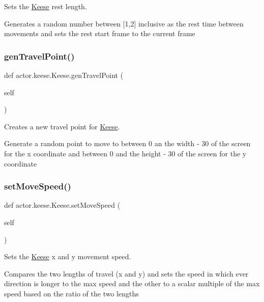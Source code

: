 Sets the \hyperlink{classactor_1_1keese_1_1_keese}{Keese} rest length. 

Generates a random number between \mbox{[}1,2\mbox{]} inclusive as the rest time between movements and sets the rest start frame to the current frame \mbox{\label{classactor_1_1keese_1_1_keese_a7abbd03624a6695b83d3086e48957d86}} 
\subsubsection{\texorpdfstring{gen\+Travel\+Point()}{genTravelPoint()}}
{\footnotesize\ttfamily def actor.\+keese.\+Keese.\+gen\+Travel\+Point (\begin{DoxyParamCaption}\item[{}]{self }\end{DoxyParamCaption})}



Creates a new travel point for \hyperlink{classactor_1_1keese_1_1_keese}{Keese}. 

Generate a random point to move to between 0 an the width -\/ 30 of the screen for the x coordinate and between 0 and the height -\/ 30 of the screen for the y coordinate \mbox{\label{classactor_1_1keese_1_1_keese_a6fe0305b143de210b4b161a1091f7891}} 
\subsubsection{\texorpdfstring{set\+Move\+Speed()}{setMoveSpeed()}}
{\footnotesize\ttfamily def actor.\+keese.\+Keese.\+set\+Move\+Speed (\begin{DoxyParamCaption}\item[{}]{self }\end{DoxyParamCaption})}



Sets the \hyperlink{classactor_1_1keese_1_1_keese}{Keese} x and y movement speed. 

Compares the two lengths of travel (x and y) and sets the speed in which ever direction is longer to the max speed and the other to a scalar multiple of the max speed based on the ratio of the two lengths \mbox{\label{classactor_1_1keese_1_1_keese_a61477e66e28a62bb0a72a302b13c3ca0}} 
